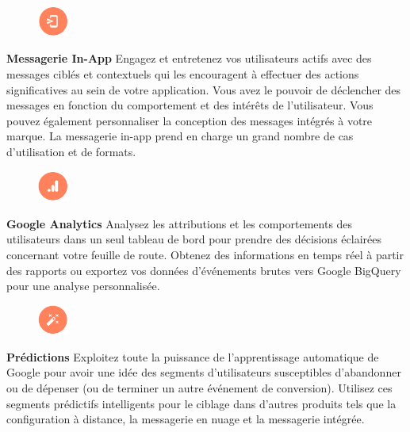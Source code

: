 \begin{figure}
	\includegraphics[width=1cm]{Images/chapter2/firebase_services/in-app_messaging.png}
\end{figure}
\textbf{Messagerie In-App} Engagez et entretenez vos utilisateurs actifs avec des messages ciblés et contextuels qui les encouragent à effectuer des actions significatives au sein de votre application. Vous avez le pouvoir de déclencher des messages en fonction du comportement et des intérêts de l'utilisateur. Vous pouvez également personnaliser la conception des messages intégrés à votre marque. La messagerie in-app prend en charge un grand nombre de cas d'utilisation et de formats.\medskip

\begin{figure}
	\includegraphics[width=1cm]{Images/chapter2/firebase_services/google_analytics.png}
\end{figure}
\textbf{Google Analytics} Analysez les attributions et les comportements des utilisateurs dans un seul tableau de bord pour prendre des décisions éclairées concernant votre feuille de route. Obtenez des informations en temps réel à partir des rapports ou exportez vos données d'événements brutes vers Google BigQuery pour une analyse personnalisée.\medskip

\begin{figure}
	\includegraphics[width=1cm]{Images/chapter2/firebase_services/predictions.png}
\end{figure}
\textbf{Prédictions} Exploitez toute la puissance de l’apprentissage automatique de Google pour avoir une idée des segments d’utilisateurs susceptibles d’abandonner ou de dépenser (ou de terminer un autre événement de conversion). Utilisez ces segments prédictifs intelligents pour le ciblage dans d'autres produits tels que la configuration à distance, la messagerie en nuage et la messagerie intégrée.\medskip

